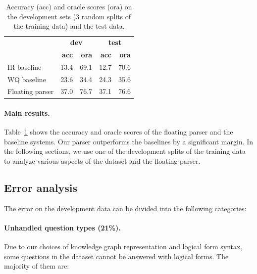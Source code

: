 \begin{table}[t]\centering
\begin{tabular}{lrrrr} \toprule
& \multicolumn{2}{c}{\textbf{dev}}
& \multicolumn{2}{c}{\textbf{test}} \\
\cmidrule(r){2-3} \cmidrule(l){4-5}
& \textbf{acc} & \textbf{ora} & \textbf{acc} & \textbf{ora} \\ \midrule
IR baseline & 13.4 & 69.1 & 12.7 & 70.6 \\
WQ baseline & 23.6 & 34.4 & 24.3 & 35.6 \\
Floating parser & 37.0 & 76.7 & 37.1 & 76.6 \\
\bottomrule
\end{tabular}
\caption[
Accuracy and oracles scores on
development and test data.
]{
Accuracy (acc) and oracle scores (ora) 
on the development sets
(3 random splits of the training data)
and the test data.}
\label{tab:sempre-results}
\end{table}

\paragraph{Main results.}
Table~\ref{tab:sempre-results}
shows the accuracy and oracle scores
of the floating parser and the baseline systems.
Our parser outperforms the baselines
by a significant margin.
In the following sections,
we use one of the development splits of the training data
to analyze various aspects of the \wtq dataset
and the floating parser.

\subsection{Error analysis}
\label{sec:sempre-error-analysis}

The error on the development data can be divided into the
following categories:

\paragraph{Unhandled question types (21\%).}
Due to our choices of knowledge graph representation
and logical form syntax,
some questions in the dataset cannot be answered
with logical forms.
The majority of them are:

